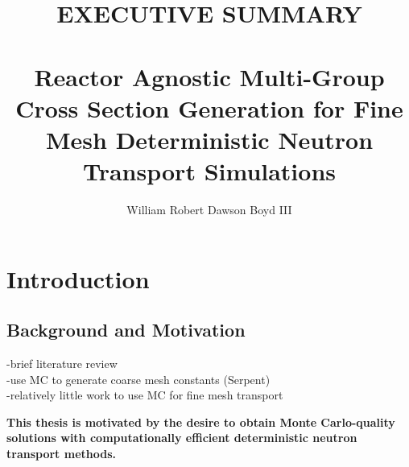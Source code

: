\documentclass[12pt,twoside]{mitthesis-exec}
\begin{document}

\title{EXECUTIVE SUMMARY \\~\\ Reactor Agnostic Multi-Group Cross Section Generation for Fine Mesh Deterministic Neutron Transport Simulations}

\author{William Robert Dawson Boyd III}





\setcounter{savepage}{\thepage}



\singlespacing 

\section*{Introduction}

\subsection*{Background and Motivation}

-brief literature review\\
  -use MC to generate coarse mesh constants (Serpent)~\cite{serpent2013manual} \\
  -relatively little work to use MC for fine mesh transport~\cite{redmond1997multigroup,cai2014condensation,nelson2014improved} \\

\begin{emphbox}
\textbf{This thesis is motivated by the desire to obtain Monte Carlo-quality solutions with computationally efficient deterministic neutron transport methods.}
\end{emphbox}
\end{document}
